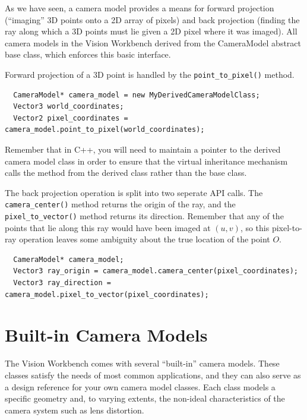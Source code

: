 As we have seen, a camera model provides a means for forward
projection (``imaging'' 3D points onto a 2D array of pixels) and back
projection (finding the ray along which a 3D points must lie given a
2D pixel where it was imaged).  All camera models in the Vision
Workbench derived from the CameraModel abstract base class, which
enforces this basic interface.

Forward projection of a 3D point is handled by the
\verb#point_to_pixel()# method.
\begin{verbatim}
  CameraModel* camera_model = new MyDerivedCameraModelClass;
  Vector3 world_coordinates;
  Vector2 pixel_coordinates = camera_model.point_to_pixel(world_coordinates);
\end{verbatim}
Remember that in C++, you will need to maintain a pointer to the
derived camera model class in order to ensure that the virtual
inheritance mechanism calls the method from the derived class rather
than the base class.

The back projection operation is split into two seperate API calls.
The \verb#camera_center()# method returns the origin of the ray, and
the \verb#pixel_to_vector()# method returns its direction.  Remember
that any of the points that lie along this ray would have been imaged
at $(u,v)$, so this pixel-to-ray operation leaves some ambiguity about
the true location of the point $O$.
\begin{verbatim}
  CameraModel* camera_model;  
  Vector3 ray_origin = camera_model.camera_center(pixel_coordinates);
  Vector3 ray_direction = camera_model.pixel_to_vector(pixel_coordinates);
\end{verbatim}
\begin{center}
\end{center}

\section{Built-in Camera Models}
\label{sec:built-in-cameras}
The Vision Workbench comes with several ``built-in'' camera models.
These classes satisfy the needs of most common applications, and they
can also serve as a design reference for your own camera model
classes.  Each class models a specific geometry and, to varying
extents, the non-ideal characteristics of the camera system such as
lens distortion.

